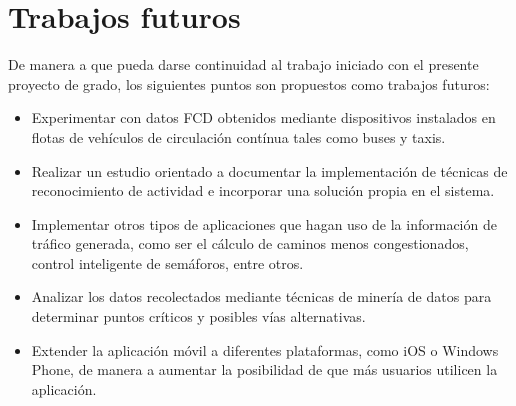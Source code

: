 \section{Trabajos futuros}

De manera a que pueda darse continuidad al trabajo iniciado con el presente proyecto de grado, los siguientes puntos son propuestos como trabajos futuros:

\begin{itemize}

\item Experimentar con datos FCD obtenidos mediante dispositivos  instalados en flotas de vehículos de circulación contínua tales como buses y taxis.

\item Realizar un estudio orientado a documentar la implementación de técnicas de reconocimiento de actividad e incorporar una solución propia en el sistema.

\item Implementar otros tipos de aplicaciones que hagan uso de la información de tráfico generada, como ser el cálculo de caminos menos congestionados, control inteligente de semáforos, entre otros.

\item Analizar los datos recolectados mediante técnicas de minería de datos para determinar puntos críticos y posibles vías alternativas.

\item Extender la aplicación móvil a diferentes plataformas, como iOS o Windows Phone, de manera a aumentar la posibilidad de que más usuarios utilicen la aplicación.

\end{itemize}

